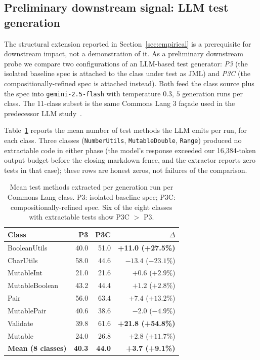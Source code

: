 \subsection{Preliminary downstream signal: LLM test generation}
\label{sec:downstream-prelim}

The structural extension reported in Section~\ref{sec:empirical} is a
prerequisite for downstream impact, not a demonstration of it. As a
preliminary downstream probe we compare two configurations of an
LLM-based test generator: \emph{P3} (the isolated baseline spec is
attached to the class under test as JML) and \emph{P3C} (the
compositionally-refined spec is attached instead). Both feed the
class source plus the spec into \texttt{gemini-2.5-flash} with
temperature $0.3$, $5$ generation runs per class. The 11-class
subset is the same Commons Lang 3 fa\c{c}ade used in the
predecessor LLM study~\cite{edmonds2026inference}.

Table~\ref{tab:downstream} reports the mean number of test methods
the LLM emits per run, for each class. Three classes
(\texttt{NumberUtils}, \texttt{MutableDouble}, \texttt{Range})
produced no extractable code in either phase (the model's response
exceeded our 16{,}384-token output budget before the closing markdown
fence, and the extractor reports zero tests in that case); these
rows are honest zeros, not failures of the comparison.

\begin{table}[ht]
\centering
\small
\caption{Mean test methods extracted per generation run per Commons Lang class. P3: isolated baseline spec; P3C: compositionally-refined spec. Six of the eight classes with extractable tests show P3C $>$ P3.}
\label{tab:downstream}
\begin{tabular}{lrrr}
\toprule
\textbf{Class} & \textbf{P3} & \textbf{P3C} & \textbf{$\Delta$} \\
\midrule
BooleanUtils  & 40.0 & 51.0 & \textbf{+11.0 (+27.5\%)} \\
CharUtils     & 58.0 & 44.6 & $-13.4$ ($-23.1\%$) \\
MutableInt    & 21.0 & 21.6 & $+0.6$ ($+2.9\%$) \\
MutableBoolean & 43.2 & 44.4 & $+1.2$ ($+2.8\%$) \\
Pair          & 56.0 & 63.4 & $+7.4$ ($+13.2\%$) \\
MutablePair   & 40.6 & 38.6 & $-2.0$ ($-4.9\%$) \\
Validate      & 39.8 & 61.6 & \textbf{+21.8 (+54.8\%)} \\
Mutable       & 24.0 & 26.8 & $+2.8$ ($+11.7\%$) \\
\midrule
\textbf{Mean (8 classes)} & \textbf{40.3} & \textbf{44.0} & \textbf{+3.7 (+9.1\%)} \\
\bottomrule
\end{tabular}
\end{table}

